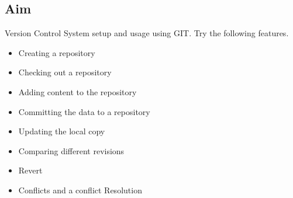 \documentclass{article}
\begin{document}
\subsection{Aim}
Version Control System setup and usage using GIT. Try the following features.
\begin{itemize}
\item Creating a repository
\item Checking out a repository
\item Adding content to the repository
\item Committing the data to a repository
\item Updating the local copy
\item Comparing different revisions
\item Revert
\item Conflicts and a conflict Resolution
\end{itemize}
\end{document}
